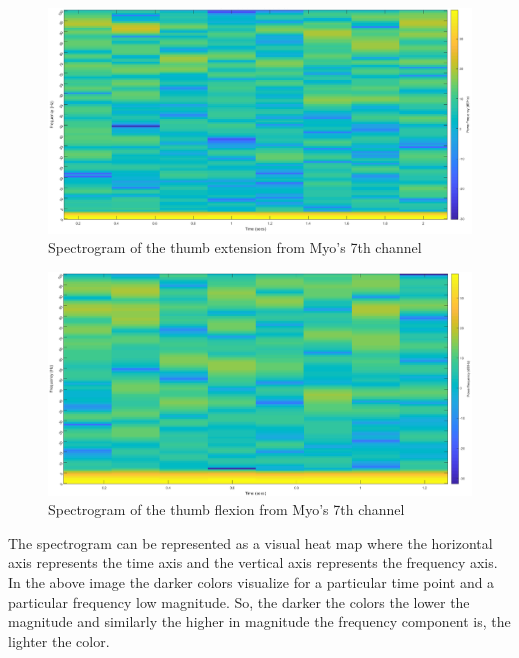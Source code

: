 \begin{figure}[!htb]
\includegraphics[width=16cm,left,keepaspectratio]{figures/STFT_ch7_ext}
\caption{Spectrogram of the thumb extension from Myo's 7th channel}
\label{fig:STFT_ch7_ext}
\end{figure}
\begin{figure}[!htb]
\includegraphics[width=16cm,left,keepaspectratio]{figures/STFT_ch7_flx}
\caption{Spectrogram of the thumb flexion from Myo's 7th channel}
\label{fig:STFT_ch7_flx}
\end{figure}
The spectrogram can be represented as a visual heat map where the horizontal axis represents the time axis and the vertical axis represents the frequency axis. In the above image the darker colors visualize for a particular time point and a particular frequency low magnitude. So, the darker the colors the lower the magnitude and similarly the higher in magnitude the frequency component is, the lighter the color.
